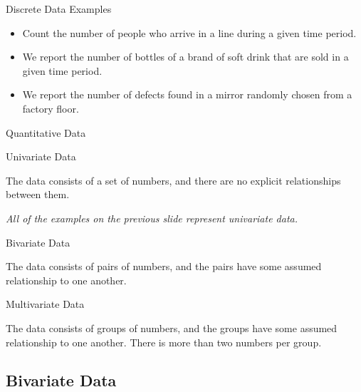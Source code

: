 \begin{frame}{Discrete Data Examples}

  \begin{itemize}
  \item Count the number of people who arrive in a line during a given
    time period.

  \item We report the number of bottles of a brand of soft drink that
    are sold in a given time period.

  \item We report the number of defects found in a mirror randomly
    chosen from a factory floor.

  \end{itemize}
  
\end{frame}


\begin{frame}{Quantitative Data}
  
  \begin{definition}{Univariate Data}

    The data consists of a set of numbers, and there are no explicit
    relationships between them.

    \textit{{\color{red}All of the examples on the previous slide
        represent univariate data.}}
    
  \end{definition}

  \begin{definition}{Bivariate Data}

    The data consists of pairs of numbers, and the pairs have some
    assumed relationship to one another.
    
  \end{definition}

  \begin{definition}{Multivariate Data}

    The data consists of groups of numbers, and the groups have some
    assumed relationship to one another. There is more than two
    numbers per group.
    
  \end{definition}


\end{frame}



\subsection{Bivariate Data}

